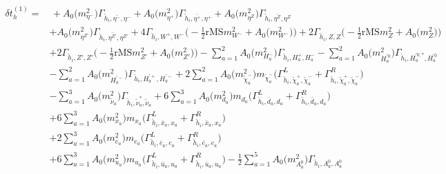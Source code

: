 \begin{align} 
\delta t^{(1)}_{h} = & \, +{A_0\Big(m^2_{\eta^-}\Big)} {\Gamma_{\check{h}_{{i}},\bar{\eta^-},\eta^-}} +{A_0\Big(m^2_{\eta^+}\Big)} {\Gamma_{\check{h}_{{i}},\bar{\eta^+},\eta^+}} +{A_0\Big(m^2_{\eta^Z}\Big)} {\Gamma_{\check{h}_{{i}},\bar{\eta^Z},\eta^Z}} \nonumber \\ 
 &+{A_0\Big(m^2_{\eta^{Z'}}\Big)} {\Gamma_{\check{h}_{{i}},\bar{\eta^{Z'}},\eta^{Z'}}} +4 {\Gamma_{\check{h}_{{i}},W^+,W^-}} \Big(-\frac{1}{2} \text{rMS} m^2_{W^-}  + {A_0\Big(m^2_{W^-}\Big)}\Big)+2 {\Gamma_{\check{h}_{{i}},Z,Z}} \Big(-\frac{1}{2} \text{rMS} m^2_{Z}  + {A_0\Big(m^2_{Z}\Big)}\Big)\nonumber \\ 
 &+2 {\Gamma_{\check{h}_{{i}},{Z'},{Z'}}} \Big(-\frac{1}{2} \text{rMS} m^2_{{Z'}}  + {A_0\Big(m^2_{{Z'}}\Big)}\Big)- \sum_{a=1}^{2}{A_0\Big(m^2_{H^-_{{a}}}\Big)} {\Gamma_{\check{h}_{{i}},H^+_{{a}},H^-_{{a}}}}  - \sum_{a=1}^{2}{A_0\Big(m^2_{H^{'0}_{{a}}}\Big)} {\Gamma_{\check{h}_{{i}},H^{{'0},*}_{{a}},H^{'0}_{{a}}}}  \nonumber \\ 
 &- \sum_{a=1}^{2}{A_0\Big(m^2_{H^{'-}_{{a}}}\Big)} {\Gamma_{\check{h}_{{i}},H^{'+}_{{a}},H^{'-}_{{a}}}}  +2 \sum_{a=1}^{2}{A_0\Big(m^2_{\tilde{\chi}^-_{{a}}}\Big)} m_{\tilde{\chi}^-_{{a}}} \Big({\Gamma^L_{\check{h}_{{i}},\tilde{\chi}^+_{{a}},\tilde{\chi}^-_{{a}}}} + {\Gamma^R_{\check{h}_{{i}},\tilde{\chi}^+_{{a}},\tilde{\chi}^-_{{a}}}}\Big) \nonumber \\ 
 &- \sum_{a=1}^{3}{A_0\Big(m^2_{\tilde{\nu}_{{a}}}\Big)} {\Gamma_{\check{h}_{{i}},\tilde{\nu}^*_{{a}},\tilde{\nu}_{{a}}}}  +6 \sum_{a=1}^{3}{A_0\Big(m^2_{d_{{a}}}\Big)} m_{d_{{a}}} \Big({\Gamma^L_{\check{h}_{{i}},\bar{d}_{{a}},d_{{a}}}} + {\Gamma^R_{\check{h}_{{i}},\bar{d}_{{a}},d_{{a}}}}\Big) \nonumber \\ 
 &+6 \sum_{a=1}^{3}{A_0\Big(m^2_{x_{{a}}}\Big)} m_{x_{{a}}} \Big({\Gamma^L_{\check{h}_{{i}},\bar{x}_{{a}},x_{{a}}}} + {\Gamma^R_{\check{h}_{{i}},\bar{x}_{{a}},x_{{a}}}}\Big) \nonumber \\ 
 &+2 \sum_{a=1}^{3}{A_0\Big(m^2_{e_{{a}}}\Big)} m_{e_{{a}}} \Big({\Gamma^L_{\check{h}_{{i}},\bar{e}_{{a}},e_{{a}}}} + {\Gamma^R_{\check{h}_{{i}},\bar{e}_{{a}},e_{{a}}}}\Big) \nonumber \\ 
 &+6 \sum_{a=1}^{3}{A_0\Big(m^2_{u_{{a}}}\Big)} m_{u_{{a}}} \Big({\Gamma^L_{\check{h}_{{i}},\bar{u}_{{a}},u_{{a}}}} + {\Gamma^R_{\check{h}_{{i}},\bar{u}_{{a}},u_{{a}}}}\Big) -\frac{1}{2} \sum_{a=1}^{5}{A_0\Big(m^2_{A^0_{{a}}}\Big)} {\Gamma_{\check{h}_{{i}},A^0_{{a}},A^0_{{a}}}}  \nonumber \\ 

\end{align}

